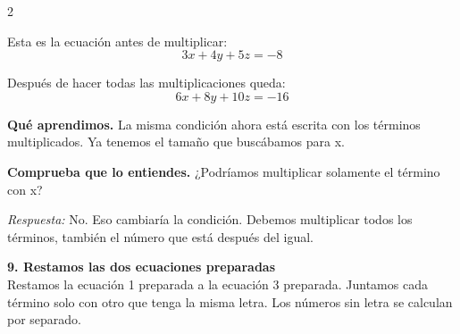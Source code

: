 \documentclass[11pt,a4paper,landscape]{article}
\begin{document}
\begin{multicols*}{2}
\begin{minipage}{\linewidth}
\par\smallskip Esta es la ecuación antes de multiplicar:
\[3x + 4y + 5z = -8\]
\par{}\par\smallskip
\par\smallskip Después de hacer todas las multiplicaciones queda:
\[6x + 8y + 10z = -16\]
\par\smallskip\textbf{Qué aprendimos.} La misma condición ahora está escrita con los términos multiplicados. Ya tenemos el tamaño que buscábamos para x.
\par\smallskip\textbf{Comprueba que lo entiendes.} ¿Podríamos multiplicar solamente el término con x?\par\textit{Respuesta:} No. Eso cambiaría la condición. Debemos multiplicar todos los términos, también el número que está después del igual.
\end{minipage}\par\medskip
\noindent\begin{minipage}{\linewidth}\textbf{9. Restamos las dos ecuaciones preparadas}\\[2pt]Restamos la ecuación 1 preparada a la ecuación 3 preparada. Juntamos cada término solo con otro que tenga la misma letra. Los números sin letra se calculan por separado.
\par{}\par\smallskip

\end{minipage}
\end{multicols*}
\end{document}
